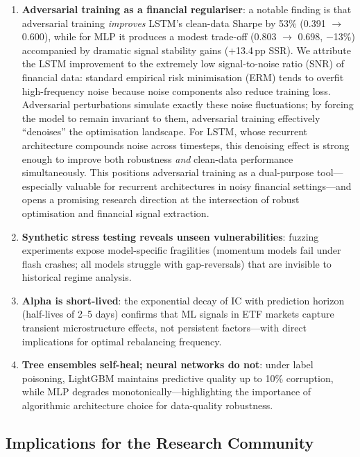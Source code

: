 \documentclass[preprint,review,12pt]{elsarticle}
\begin{document}
\begin{enumerate}[leftmargin=1.6em]
  \item \textbf{Adversarial training as a financial regulariser}: a notable finding is that adversarial training \emph{improves} LSTM's clean-data Sharpe by 53\% (0.391 $\to$ 0.600), while for MLP it produces a modest trade-off (0.803 $\to$ 0.698, $-$13\%) accompanied by dramatic signal stability gains (+13.4\,pp SSR). We attribute the LSTM improvement to the extremely low signal-to-noise ratio (SNR) of financial data: standard empirical risk minimisation (ERM) tends to overfit high-frequency noise because noise components also reduce training loss. Adversarial perturbations simulate exactly these noise fluctuations; by forcing the model to remain invariant to them, adversarial training effectively ``denoises'' the optimisation landscape. For LSTM, whose recurrent architecture compounds noise across timesteps, this denoising effect is strong enough to improve both robustness \emph{and} clean-data performance simultaneously. This positions adversarial training as a dual-purpose tool---especially valuable for recurrent architectures in noisy financial settings---and opens a promising research direction at the intersection of robust optimisation and financial signal extraction.

  \item \textbf{Synthetic stress testing reveals unseen vulnerabilities}: fuzzing experiments expose model-specific fragilities (momentum models fail under flash crashes; all models struggle with gap-reversals) that are invisible to historical regime analysis.

  \item \textbf{Alpha is short-lived}: the exponential decay of IC with prediction horizon (half-lives of 2--5 days) confirms that ML signals in ETF markets capture transient microstructure effects, not persistent factors---with direct implications for optimal rebalancing frequency.

  \item \textbf{Tree ensembles self-heal; neural networks do not}: under label poisoning, LightGBM maintains predictive quality up to 10\% corruption, while MLP degrades monotonically---highlighting the importance of algorithmic architecture choice for data-quality robustness.
\end{enumerate}

\subsection{Implications for the Research Community}
\end{document}
